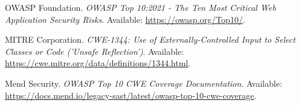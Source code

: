 \documentclass[]{UCD_CS_FYP_Report}
\begin{document}
\newpage
\begin{thebibliography}{99}
 OWASP Foundation. \emph{OWASP Top 10:2021 - The Ten Most Critical Web Application Security Risks}. Available: \url{https://owasp.org/Top10/}.

 MITRE Corporation. \emph{CWE-1344: Use of Externally-Controlled Input to Select Classes or Code ('Unsafe Reflection')}. Available: \url{https://cwe.mitre.org/data/definitions/1344.html}.

 Mend Security. \emph{OWASP Top 10 CWE Coverage Documentation}. Available: \url{https://docs.mend.io/legacy-sast/latest/owasp-top-10-cwe-coverage}.
\end{thebibliography}
\label{endpage}
\end{document}
